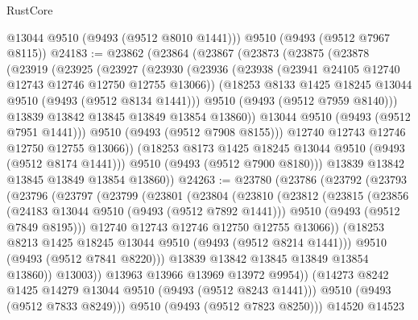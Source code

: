 \begin{lexlean}{RustCore}
\begin{coremodule}
      @13044
      @9510
      (@9493 (@9512 @8010 @1441)))
    @9510
    (@9493 (@9512 @7967 @8115))
@24183 := @23862
    (@23864
      (@23867
        (@23873
          (@23875
            (@23878
              (@23919
                (@23925
                  (@23927
                    (@23930
                      (@23936
                        (@23938 (@23941 @24105 @12740 @12743 @12746 @12750 @12755 @13066))
                        (@18253 @8133 @1425 @18245 @13044 @9510 (@9493 (@9512 @8134 @1441)))
                        @9510
                        (@9493 (@9512 @7959 @8140)))
                      @13839
                      @13842
                      @13845
                      @13849
                      @13854
                      @13860))
                  @13044
                  @9510
                  (@9493 (@9512 @7951 @1441)))
                @9510
                (@9493 (@9512 @7908 @8155)))
              @12740
              @12743
              @12746
              @12750
              @12755
              @13066))
          (@18253 @8173 @1425 @18245 @13044 @9510 (@9493 (@9512 @8174 @1441)))
          @9510
          (@9493 (@9512 @7900 @8180)))
        @13839
        @13842
        @13845
        @13849
        @13854
        @13860))
@24263 := @23780
    (@23786
      (@23792
        (@23793
          (@23796
            (@23797
              (@23799
                (@23801
                  (@23804
                    (@23810
                      (@23812
                        (@23815
                          (@23856
                            (@24183 @13044 @9510 (@9493 (@9512 @7892 @1441)))
                            @9510
                            (@9493 (@9512 @7849 @8195)))
                          @12740
                          @12743
                          @12746
                          @12750
                          @12755
                          @13066))
                      (@18253 @8213 @1425 @18245 @13044 @9510 (@9493 (@9512 @8214 @1441)))
                      @9510
                      (@9493 (@9512 @7841 @8220)))
                    @13839
                    @13842
                    @13845
                    @13849
                    @13854
                    @13860))
                @13003))
            @13963
            @13966
            @13969
            @13972
            @9954))
        (@14273 @8242 @1425 @14279 @13044 @9510 (@9493 (@9512 @8243 @1441)))
        @9510
        (@9493 (@9512 @7833 @8249)))
      @9510
      (@9493 (@9512 @7823 @8250)))
    @14520
    @14523

\end{coremodule}
\end{lexlean}
